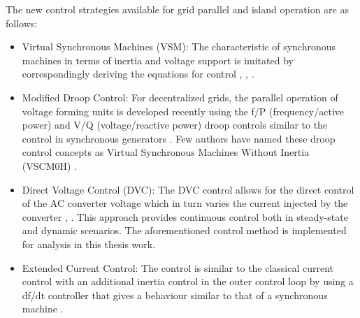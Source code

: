 The new control strategies available for grid parallel and island operation are as follows:
\begin{itemize}
    \item Virtual Synchronous Machines (VSM): The characteristic of synchronous machines in terms of inertia and voltage support is imitated by correspondingly deriving the equations for control \cite{chen_comparison_2012}, \cite{duckwitz_operating_behavior}, \cite{lu_virtual_2019}.
    
    \item Modified Droop Control:
    For decentralized grids, the parallel operation of voltage forming units is developed recently using the f/P (frequency/active power) and V/Q (voltage/reactive power) droop controls similar to the control in synchronous generators \cite{lopes2012pv}. Few authors have named these droop control concepts as Virtual Synchronous Machines Without Inertia (VSCM0H) \cite{yu2016use}.
    
    \item Direct Voltage Control (\gls{DVC}):
    The \gls{DVC} control allows for the direct control of the \gls{AC} converter voltage which in turn varies the current injected by the converter  \cite{korai_dynamic_2019}, \cite{erlich_new_2017}. This approach provides continuous control both in steady-state and dynamic scenarios. The aforementioned control method is implemented for analysis in this thesis work.
    
    \item Extended Current Control:
    The control is similar to the classical current control with an additional inertia control in the outer control loop by using a df/dt controller that gives a behaviour similar to that of a synchronous machine \cite{duckwitz_derivation_2019}. 
    
\end{itemize}




